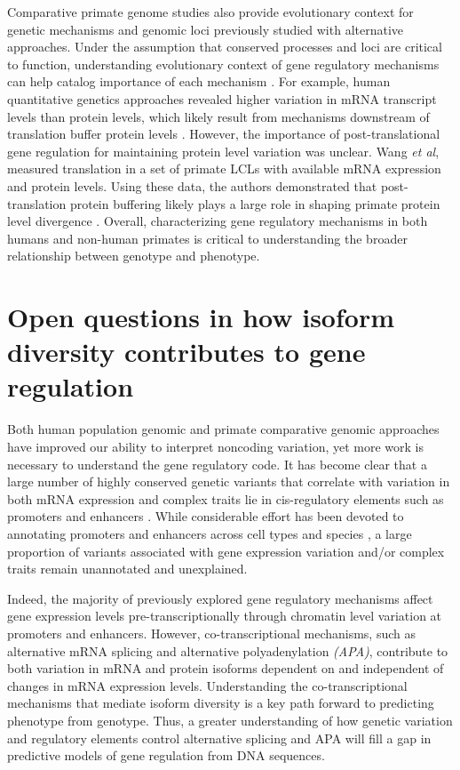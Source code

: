 Comparative primate genome studies also provide evolutionary context for genetic mechanisms and genomic loci previously studied with alternative approaches. Under the assumption that conserved processes and loci are critical to function, understanding evolutionary context of gene regulatory mechanisms can help catalog importance of each mechanism \citep{housman_prime_2020}. For example, human quantitative genetics approaches revealed higher variation in mRNA transcript levels than protein levels, which likely result from mechanisms downstream of translation buffer protein levels \citep{battle_impact_2015}. However, the importance of post-translational gene regulation for maintaining protein level variation was unclear. Wang \emph{et al}, measured translation in a set of primate LCLs with available mRNA expression and protein levels. Using these data, the authors demonstrated that post-translation protein buffering likely plays a large role in shaping primate protein level divergence \citep{wang_post-translational_2018}. Overall, characterizing gene regulatory mechanisms in both humans and non-human primates is critical to understanding the broader relationship between genotype and phenotype. 

\section{Open questions in how isoform diversity contributes to gene regulation}

Both human population genomic and primate comparative genomic approaches have improved our ability to interpret noncoding variation, yet more work is necessary to understand the gene regulatory code.  It has become clear that a large number of highly conserved genetic variants that correlate with variation in both mRNA expression and complex traits lie in cis-regulatory elements such as promoters and enhancers \citep{maurano_systematic_2012, Trynka2013, zhou_epigenetic_2014}. While considerable effort has been devoted to annotating promoters and enhancers across cell types and species \citep{bernstein_nih_2010, the_encode_project_consortium_integrated_2012, mouse_encode_consortium_encyclopedia_2012, modencode_consortium_unlocking_2009}, a large proportion of variants associated with gene expression variation and/or complex traits remain unannotated and unexplained.

Indeed, the majority of previously explored gene regulatory mechanisms affect gene expression levels pre-transcriptionally through chromatin level variation at promoters and enhancers. However, co-transcriptional mechanisms, such as alternative mRNA splicing and alternative polyadenylation \emph{(APA)}, contribute to both variation in mRNA and protein isoforms dependent on and independent of changes in mRNA expression levels. Understanding the co-transcriptional mechanisms that mediate isoform diversity is a key path forward to predicting phenotype from genotype.  Thus, a greater understanding of how genetic variation and regulatory elements control alternative splicing and APA will fill a gap in predictive models of gene regulation from DNA sequences.

